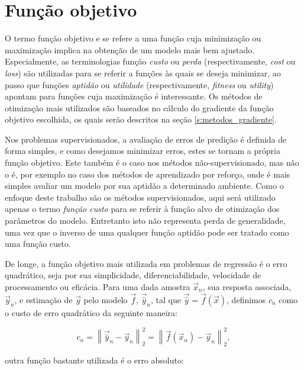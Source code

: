  \section{Função objetivo} \label{s:objetivo}

    O termo função objetivo e se refere a uma função cuja minimização ou maximização implica na obtenção de um modelo mais bem ajustado. Especialmente, as terminologias função \emph{custo} ou \emph{perda} (respectivamente, \textit{cost} ou \textit{loss}) são utilizadas para se referir a funções às quais se deseja minimizar, ao passo que funções \emph{aptidão} ou \emph{utilidade} (respectivamente, \textit{fitness} ou \textit{utility}) apontam para funções cuja maximização é interessante. Os métodos de otimização mais utilizados são baseados no cálculo do gradiente da função objetivo escolhida, os quais serão descritos na seção \ref{s:metodos_gradiente}. %

    Nos problemas supervisionados, a avaliação de erros de predição é definida de forma simples, e como desejamos minimizar erros, estes se tornam a própria função objetivo. Este também é o caso nos métodos não-supervisionado, mas não o é, por exemplo no caso dos métodos de aprendizado por reforço, onde é mais simples avaliar um modelo por sua aptidão a determinado ambiente. Como o enfoque deste trabalho são os métodos supervisionados, aqui será utilizado apenas o termo \emph{função custo} para se referir à função alvo de otimização dos parâmetros do modelo. Entretanto isto não representa perda de generalidade, uma vez que o inverso de uma qualquer função aptidão pode ser tratado como uma função custo.

    De longe, a função objetivo mais utilizada em problemas de regressão é o erro quadrático, seja por sua simplicidade, diferenciabilidade, velocidade de processamento ou eficácia. Para uma dada amostra $\vec{x}_n$, sua resposta associada, $\vec{y}_n$, e estimação de $\vec{y}$ pelo modelo $\vec{f}$, $\vec{\hat{y}}_n$, tal que $\vec{\hat{y}} = \vec{f}(\vec{x})$, definimos $c_n$ como o custo de erro quadrático da seguinte maneira:

    \begin{equation} \label{e:c_se_n}
      c_n =
      \left\| \vec{\hat{y}}_n - \vec{y}_n \right\|_2^2 =
      \left\| \vec{f}(\vec{x}_n) - \vec{y}_n \right\|_2^2
      ,
    \end{equation}

    \noindent outra função bastante utilizada é o erro absoluto:

